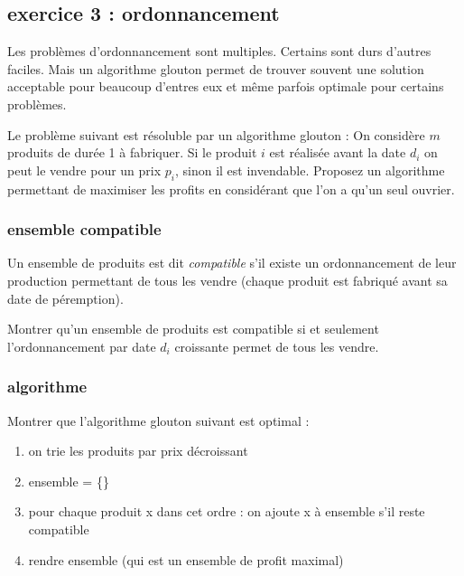 \documentclass[
]{article}
\providecommand{\tightlist}{%
  \setlength{\itemsep}{0pt}\setlength{\parskip}{0pt}}
\begin{document}
\hypertarget{exercice-3-ordonnancement}{%
\subsection{exercice 3 :
ordonnancement}\label{exercice-3-ordonnancement}}

Les problèmes d'ordonnancement sont multiples. Certains sont durs
d'autres faciles. Mais un algorithme glouton permet de trouver souvent
une solution acceptable pour beaucoup d'entres eux et même parfois
optimale pour certains problèmes.

Le problème suivant est résoluble par un algorithme glouton : On
considère $m$ produits de durée 1 à fabriquer. Si le produit $i$ est
réalisée avant la date $d_i$ on peut le vendre pour un prix $p_i$,
sinon il est invendable. Proposez un algorithme permettant de maximiser
les profits en considérant que l'on a qu'un seul ouvrier.

\hypertarget{ensemble-compatible}{%
\subsubsection{ensemble compatible}\label{ensemble-compatible}}

Un ensemble de produits est dit \emph{compatible} s'il existe un
ordonnancement de leur production permettant de tous les vendre (chaque
produit est fabriqué avant sa date de péremption).

Montrer qu'un ensemble de produits est compatible si et seulement
l'ordonnancement par date $d_i$ croissante permet de tous les vendre.

\hypertarget{algorithme}{%
\subsubsection{algorithme}\label{algorithme}}

Montrer que l'algorithme glouton suivant est optimal :

\begin{enumerate}
\def\labelenumi{\arabic{enumi}.}
\tightlist
\item
  on trie les produits par prix décroissant
\item
  ensemble = \{\}
\item
  pour chaque produit x dans cet ordre : on ajoute x à ensemble s'il
  reste compatible
\item
  rendre ensemble (qui est un ensemble de profit maximal)
\end{enumerate}
\end{document}
